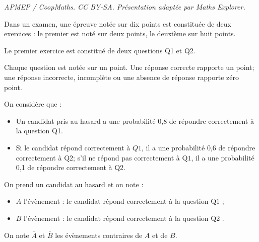 \documentclass[10pt]{article}
\begin{document}
\noindent\textit{APMEP / CoopMaths. CC BY-SA. Présentation adaptée par Maths Explorer.}\par\medskip
Dans un examen, une épreuve notée sur dix points est constituée de deux exercices : le premier est noté sur deux points, le deuxième sur huit points.


\medskip


\medskip

Le premier exercice est constitué de deux questions Q1 et Q2.

Chaque question est notée sur un point. Une réponse correcte rapporte un point; une réponse incorrecte, incomplète ou une absence de réponse rapporte zéro point.

On considère que :

\begin{itemize}
\item Un candidat pris au hasard a une probabilité 0,8 de répondre correctement à la question Q1.
\item Si le candidat répond correctement à $Q 1$, il a une probabilité 0,6 de répondre correctement à $\mathrm{Q} 2$; s'il ne répond pas correctement à $\mathrm{Q} 1$, il a une probabilité 0,1 de répondre correctement à Q2.
\end{itemize}

On prend un candidat au hasard et on note :

	\begin{itemize}
		\item $A$ l'évènement : \og{}le candidat répond correctement à la question $\mathrm{Q} 1$ \fg{} ;
		\item $B$ l'évènement : \og{}le candidat répond correctement à la question Q2 \fg{}.
	\end{itemize}

On note $\overline{A}$ et $\overline{B}$ les évènements contraires de $A$ et de $B$.
\end{document}
